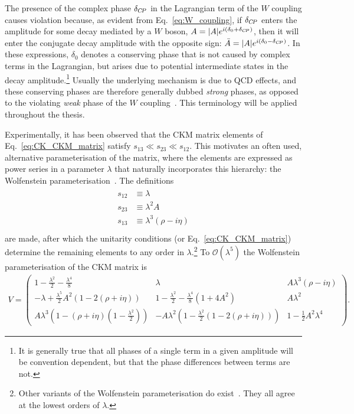 The presence of the complex phase $\delta_{{C\!P}}$ in the Lagrangian term of the $W$ coupling causes \CP violation because, as evident from Eq.~\eqref{eq:W_coupling}, if $\delta_{{C\!P}}$ enters the amplitude for some decay mediated by a $W$ boson, $A=|A|e^{i(\delta_0 + \delta_{{C\!P}})}$, then it will enter the \CP conjugate decay amplitude with the opposite sign: $\bar A=|A|e^{i(\delta_0 - \delta_{{C\!P}})}$. In these expressions, $\delta_0$ denotes a \CP conserving phase that is not caused by complex terms in the Lagrangian, but arises due to potential intermediate states in the decay amplitude.\footnote{It is generally true that all phases of a single term in a given amplitude will be convention dependent, but that the phase differences between terms are not.} Usually the underlying mechanism is due to QCD effects, and these \CP conserving phases are therefore generally dubbed \emph{strong} phases, as opposed to the \CP violating \emph{weak} phase of the $W$ coupling~\cite{PDG2020}. This terminology will be applied throughout the thesis. 

Experimentally, it has been observed that the CKM matrix elements of Eq.~\eqref{eq:CK_CKM_matrix} satisfy $s_{13}\ll s_{23} \ll s_{12}$. This motivates an often used, alternative parameterisation of the matrix, where the elements are expressed as power series in a parameter  $\lambda$ that naturally incorporates this hierarchy: the Wolfenstein parameterisation~\cite{wolfensteinParametrizationKobayashiMaskawaMatrix1983}. The definitions
\begin{align}
    \begin{split}
         s_{12} &\equiv \lambda \\
         s_{23} &\equiv \lambda^2A \\
         s_{13} &\equiv \lambda^3(\rho - i \eta) \\
    \end{split}
\end{align}
are made, after which the unitarity conditions (or Eq.~\ref{eq:CK_CKM_matrix}) determine the remaining elements to any order in $\lambda$.\footnote{Other variants of the Wolfenstein parameterisation do exist~\cite{ahnWolfensteinParametrizationHigher2011}. They all agree at the lowest orders of $\lambda$.} 
To $\mathcal O (\lambda^5)$ the Wolfenstein parameterisation of the CKM matrix is~\cite{burasWaitingTopQuark1994,charlesCPViolationCKM2005}
% 
\begin{align}
    V = \begin{pmatrix}
        1-\frac{\lambda^2}{2} -\frac{\lambda^4}{8}&
        \lambda &
        A\lambda^3(\rho - i \eta) \\
        -\lambda+\frac{\lambda^5}{2}A^2(1-2(\rho+i\eta)) &
        1 - \frac{\lambda^2}{2} - \frac{\lambda^4}{8}(1+4A^2) &
        A\lambda^2 \\
        A \lambda^3(1-(\rho + i\eta)(1 - \frac{\lambda^2}{2})) &
        -A\lambda^2 (1- \frac{\lambda^2}{2}(1-2(\rho+i\eta)))&
        1 - \frac{1}{2}A^2\lambda^4
    \end{pmatrix}.
\end{align}{}

